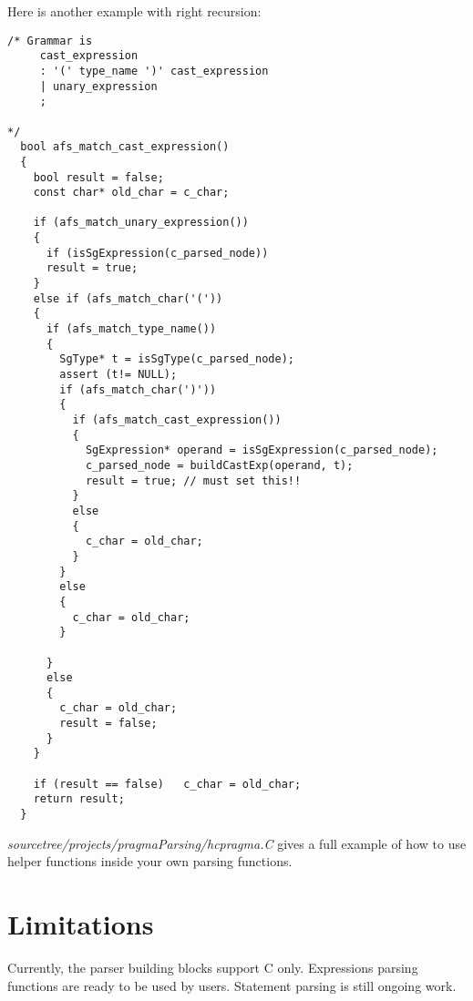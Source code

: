 Here is another example with right recursion:
\begin{verbatim}
/* Grammar is
     cast_expression
     : '(' type_name ')' cast_expression
     | unary_expression
     ;

*/
  bool afs_match_cast_expression()
  {
    bool result = false;
    const char* old_char = c_char;

    if (afs_match_unary_expression())
    {
      if (isSgExpression(c_parsed_node))
      result = true;
    }
    else if (afs_match_char('('))
    {
      if (afs_match_type_name())
      {
        SgType* t = isSgType(c_parsed_node);
        assert (t!= NULL);
        if (afs_match_char(')'))
        {
          if (afs_match_cast_expression())
          {
            SgExpression* operand = isSgExpression(c_parsed_node);
            c_parsed_node = buildCastExp(operand, t);
            result = true; // must set this!!
          }
          else
          {
            c_char = old_char;
          }
        }
        else
        {
          c_char = old_char;
        }

      }
      else
      {
        c_char = old_char;
        result = false;
      }
    }

    if (result == false)   c_char = old_char;
    return result;
  }

\end{verbatim}



\textit{sourcetree/projects/pragmaParsing/hcpragma.C} gives a full example of how to use helper functions inside your own parsing functions.

\section{Limitations}
Currently, the parser building blocks support C only. Expressions parsing functions are ready to be used by users. 
Statement parsing is still ongoing work. 



